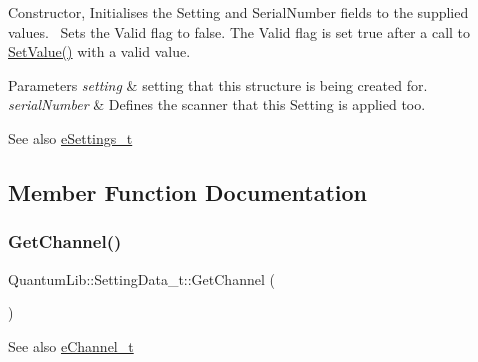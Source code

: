 Constructor, Initialises the Setting and Serial\+Number fields to the supplied values.~\newline
Sets the Valid flag to false. The Valid flag is set true after a call to \mbox{\hyperlink{struct_quantum_lib_1_1_setting_data__t_afbf4f07b95c1ef9d35bfdf8a362bd2e2}{Set\+Value()}} with a valid value.~\newline

\begin{DoxyParams}{Parameters}
{\em setting} & setting that this structure is being created for. \\
\hline
{\em serial\+Number} & Defines the scanner that this Setting is applied too. \\
\hline
\end{DoxyParams}
\begin{DoxySeeAlso}{See also}
\mbox{\hyperlink{namespace_quantum_lib_acc8124e3e65bca4aa798d03a55e3d54c}{e\+Settings\+\_\+t}} 
\end{DoxySeeAlso}


\subsection{Member Function Documentation}
\mbox{\label{struct_quantum_lib_1_1_setting_data__t_a355a145df04da301a7902d5a89d99f44}} 
\subsubsection{\texorpdfstring{Get\+Channel()}{GetChannel()}}
{\footnotesize\ttfamily Quantum\+Lib\+::\+Setting\+Data\+\_\+t\+::\+Get\+Channel (\begin{DoxyParamCaption}{ }\end{DoxyParamCaption})\hspace{0.3cm}{\ttfamily [inline]}}

\begin{DoxySeeAlso}{See also}
\mbox{\hyperlink{namespace_quantum_lib_ad62fc36ad3cd7ee810cbfc545d04ea9c}{e\+Channel\+\_\+t}} 
\end{DoxySeeAlso}
\mbox{\label{struct_quantum_lib_1_1_setting_data__t_a884208dbd84bede1bb678526f18c98b7}} 
